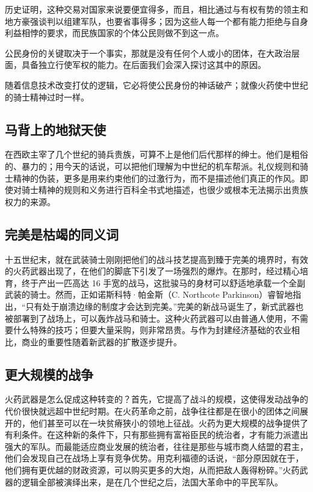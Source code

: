 历史证明，这种交易对国家来说要便宜得多，而且，相比通过与有权有势的领主和地方豪强谈判以组建军队，也要省事得多；因为这些人每一个都有能力拒绝与自身利益相悖的要求，而民族国家的个体公民则做不到这一点。

公民身份的关键取决于一个事实，那就是没有任何个人或小的团体，在大政治层面，具备独立行使军权的能力。在后面我们会深入探讨这其中的原因。

随着信息技术改变打仗的逻辑，它必将使公民身份的神话破产；就像火药使中世纪的骑士精神过时一样。

\subsection{马背上的地狱天使}
在西欧主宰了几个世纪的骑兵贵族，可算不上是他们后代那样的绅士。他们是粗俗的、暴力的；用今天的话说，可以把他们理解为中世纪的机车帮派。礼仪规则和骑士精神的伪装，更多是用来约束他们的过激行为，而不是描述他们真正的作风。即使对骑士精神的规则和义务进行百科全书式地描述，也很少或根本无法揭示出贵族权力的来源。

\subsection{完美是枯竭的同义词}
十五世纪末，就在武装骑士刚刚把他们的战斗技艺提高到臻于完美的境界时，有效的火药武器出现了，在他们的脚底下引发了一场强烈的爆炸。在那时，经过精心培育，终于产出一匹高达 16 手宽的战马，这批骏马的身材可以舒适地承载一个全副武装的骑士。然而，正如诺斯科特·帕金斯（C. Northcote Parkinson）睿智地指出，“只有处于崩溃边缘的制度才会达到完美。”完美的新战马诞生了，新式武器也被部署到了战场上，可以轰炸战马和骑士。这种火药武器可以由普通人使用，不需要什么特殊的技巧；但要大量采购，则非常昂贵。与作为封建经济基础的农业相比，商业的重要性随着新武器的扩散逐步提升。

\subsection{更大规模的战争}
火药武器是怎么促成这种转变的？首先，它提高了战斗的规模，这使得发动战争的代价很快就远超中世纪时期。在火药革命之前，战争往往都是在很小的团体之间展开的，他们甚至可以在一块贫瘠狭小的领地上征战。火药为更大规模的战争提供了有利条件。在这种新的条件下，只有那些拥有富裕臣民的统治者，才有能力派遣出强大的军队。而最能适应商业发展的统治者，往往是那些与城市商人结盟的君主，他们会发现自己在战场上享有竞争优势。用克利福德的话说，“部分原因就在于，他们拥有更优越的财政资源，可以购买更多的大炮，从而把敌人轰得粉碎。”火药武器的逻辑全部被演绎出来，是在几个世纪之后，法国大革命中的平民军队。

